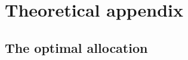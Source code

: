 \documentclass[12pt]{article}
\begin{document}



\clearpage
\renewcommand{\contentsname}{Appendix}
\tableofcontents

\clearpage
\appendix
{}
\renewcommand\thefigure{\thesection.\arabic{figure}}
\renewcommand\thetable{\thesection.\arabic{table}}

\section{Theoretical appendix}
\label{a:theoretical appendix}

\subsection{The optimal allocation}
\label{a:optimal allocation}
\end{document}
